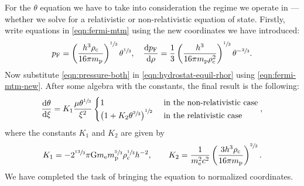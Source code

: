 \documentclass[]{article}
\newcommand{\dd}{\mathop{}\!\mathrm{d}}
\newcommand{\rhoCentre}{\rho_\mathrm{c}}
\newcommand{\fermiMtm}{p_\mathrm{F}}
\newcommand{\massElectron}{m_\mathrm{e}}
\newcommand{\massProton}{m_\mathrm{p}}
\newcommand{\gravconst}{\mathrm{G}}
\begin{document}
	For the $\theta$ equation we have to take into consideration the regime we operate in --- whether we solve for a relativistic or non-relativistic equation of state. Firstly, write equations in \eqref{eqn:fermi-mtm} using the new coordinates we have introduced:
	\begin{equation}\label{eqn:fermi-mtm-new}
		\fermiMtm = \left( \frac{h^3 \rhoCentre}{16 \pi \massProton}\right)^{\sfrac{1}{3}} \theta^{\sfrac{1}{3}} , \quad \frac{\dd \fermiMtm}{\dd \rho} = \frac{1}{3} \left( \frac{h^3}{16 \pi \massProton \rhoCentre^2}\right)^{\sfrac{1}{3}} \theta^{-\sfrac{2}{3}}.
	\end{equation}
	Now substitute \eqref{eqn:pressure-both} in \eqref{eqn:hydrostat-equil-rhor} using \eqref{eqn:fermi-mtm-new}. After some algebra with the constants, the final result is the following:
	\begin{equation}
		\frac{\dd \theta}{\dd \xi} = K_1 \frac{\mu \theta^{\sfrac{1}{3}}}{\xi^2} \begin{cases}
			1 & \text{ in the non-relativistic case}\\
			\left(1 + K_2 \theta^{\sfrac{2}{3}}\right)^{\sfrac{1}{2}} & \text{ in the relativistic case}
		\end{cases},
	\end{equation}
	where the constants $K_1$ and $K_2$ are given by
	\begin{equation}
		K_1 = - 2^{\sfrac{13}{3}} \pi \gravconst \massElectron \massProton^{\sfrac{5}{3}} \rhoCentre^{\sfrac{1}{3}} h^{-2} , \quad \quad K_2 = \frac{1}{\massElectron^2 c^2} \left( \frac{3h^3 \rhoCentre}{16 \pi \massProton} \right)^{\sfrac{2}{3}}.
	\end{equation}
	We have completed the task of bringing the equation to normalized coordinates. 
\end{document}
